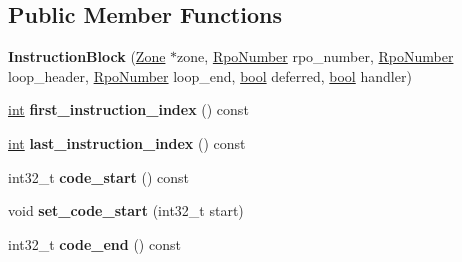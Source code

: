 \subsection*{Public Member Functions}
\begin{DoxyCompactItemize}
\item 
\mbox{\label{classv8_1_1internal_1_1compiler_1_1InstructionBlock_a3542b48244389985570340f50a7d8a80}} 
{\bfseries Instruction\+Block} (\mbox{\hyperlink{classv8_1_1internal_1_1Zone}{Zone}} $\ast$zone, \mbox{\hyperlink{classv8_1_1internal_1_1compiler_1_1RpoNumber}{Rpo\+Number}} rpo\+\_\+number, \mbox{\hyperlink{classv8_1_1internal_1_1compiler_1_1RpoNumber}{Rpo\+Number}} loop\+\_\+header, \mbox{\hyperlink{classv8_1_1internal_1_1compiler_1_1RpoNumber}{Rpo\+Number}} loop\+\_\+end, \mbox{\hyperlink{classbool}{bool}} deferred, \mbox{\hyperlink{classbool}{bool}} handler)
\item 
\mbox{\label{classv8_1_1internal_1_1compiler_1_1InstructionBlock_acd782d491443a853b7b6337eab99fccb}} 
\mbox{\hyperlink{classint}{int}} {\bfseries first\+\_\+instruction\+\_\+index} () const
\item 
\mbox{\label{classv8_1_1internal_1_1compiler_1_1InstructionBlock_aba28249b12b3c4d9060f8e9e8791637a}} 
\mbox{\hyperlink{classint}{int}} {\bfseries last\+\_\+instruction\+\_\+index} () const
\item 
\mbox{\label{classv8_1_1internal_1_1compiler_1_1InstructionBlock_a452f82aa1961792f0985d802916bb51f}} 
int32\+\_\+t {\bfseries code\+\_\+start} () const
\item 
\mbox{\label{classv8_1_1internal_1_1compiler_1_1InstructionBlock_a09326e22bbb1d4a75410a128efa14a94}} 
void {\bfseries set\+\_\+code\+\_\+start} (int32\+\_\+t start)
\item 
\mbox{\label{classv8_1_1internal_1_1compiler_1_1InstructionBlock_aaff78149a3887aabf72a45f84e0dfe39}} 
int32\+\_\+t {\bfseries code\+\_\+end} () const
\item 

\end{DoxyCompactItemize}

